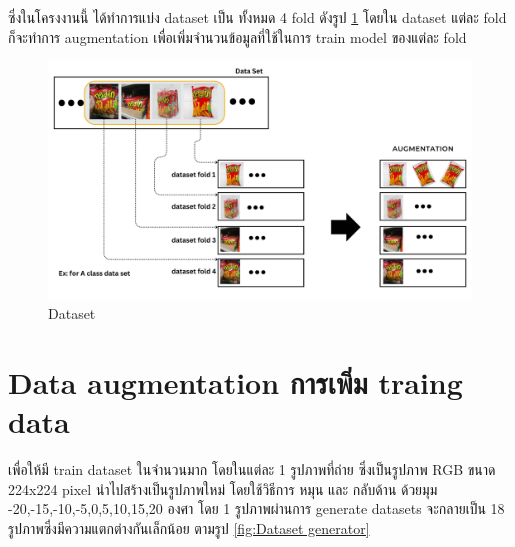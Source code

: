 ซึ่งในโครงงานนี้ ได้ทำการแบ่ง dataset เป็น ทั้งหมด 4 fold ดังรูป \ref{fig:Dataset}
โดยใน dataset แต่ละ fold ก็จะทำการ augmentation เพื่อเพิ่มจำนวนข้อมูลที่ใช้ในการ train model ของแต่ละ fold
\begin{figure}[h]
  \begin{center}

    \includegraphics[scale=0.25]{pic/model/fold_aug.png}
  \end{center}

  \caption[Dataset]{Dataset}
  \label{fig:Dataset}
\end{figure}

\newpage



\section{Data augmentation การเพิ่ม traing data}
เพื่อให้มี train dataset ในจำนวนมาก
โดยในแต่ละ 1 รูปภาพที่ถ่าย ซึ่งเป็นรูปภาพ RGB ขนาด 224x224 pixel
นำไปสร้างเป็นรูปภาพใหม่ โดยใช้วิธีการ หมุน และ กลับด้าน ด้วยมุม -20,-15,-10,-5,0,5,10,15,20 องศา
โดย 1 รูปภาพผ่านการ generate datasets จะกลายเป็น 18 รูปภาพซึ่งมีความแตกต่างกันเล็กน้อย ตามรูป \ref{fig:Dataset generator}


